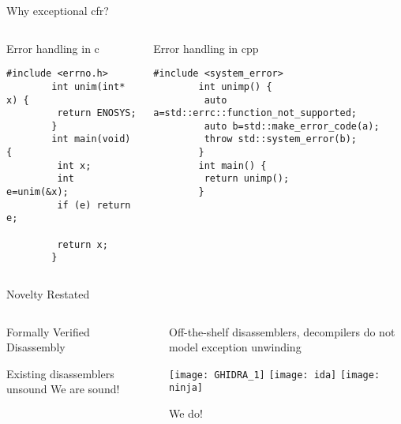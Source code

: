 \begin{frame}[fragile]{Why exceptional \gls{cfr}?}
  \begin{columns}[t]
    \begin{block}{Error handling in \gls{c}}
      \begin{lstlisting}[gobble=8]
        #include <errno.h>
        int unim(int* x) {
         return ENOSYS;
        }
        int main(void) {
         int x;
         int e=unim(&x);
         if (e) return e;

         return x;
        }
      \end{lstlisting}
    \end{block}

    \begin{block}{Error handling in \gls{cpp}}
      \begin{lstlisting}[gobble=8]
        #include <system_error>
        int unimp() {
         auto a=std::errc::function_not_supported;
         auto b=std::make_error_code(a);
         throw std::system_error(b);
        }
        int main() {
         return unimp();
        }
      \end{lstlisting}
    \end{block}
  \end{columns}
\end{frame}

\begin{frame}{Novelty Restated}
  \begin{columns}
    \begin{block}{Formally Verified Disassembly}
      \begin{outline}
        \pause
        \1 Existing disassemblers \alert{unsound} %
        \pause
        \1 \LARGE \alert{We are sound!}
      \end{outline}
    \end{block}

    \pause

    \begin{block}{}
      \begin{outline}
        \pause
        \1 Off-the-shelf \alert{disassemblers, decompilers} do not model \alert{exception unwinding}
        \begin{center}
          \texttt{[image: GHIDRA\_1]}
          \hspace{1cm}
          \texttt{[image: ida]}
          \hspace{1cm}
          \texttt{[image: ninja]}
        \end{center}
        \pause
        \1 \LARGE \alert{We do!}
      \end{outline}
    \end{block}
  \end{columns}
\end{frame}
